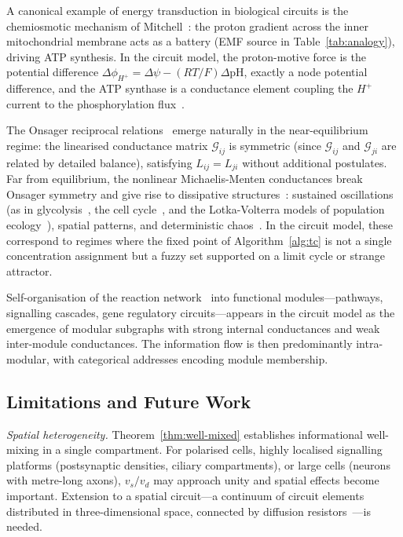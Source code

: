 \documentclass[twocolumn,10pt,a4paper]{article}
\newcommand{\Gcond}{\mathcal{G}}
\begin{document}
A canonical example of energy transduction in biological circuits is the
chemiosmotic mechanism of Mitchell~\cite{Mitchell1961}: the proton gradient
across the inner mitochondrial membrane acts as a battery (EMF source in
Table~\ref{tab:analogy}), driving ATP synthesis.  In the circuit model, the
proton-motive force is the potential difference $\Delta\phi_{H^+}=
\Delta\psi - (RT/F)\Delta\mathrm{pH}$, exactly a node potential difference,
and the ATP synthase is a conductance element coupling the $H^+$ current to
the phosphorylation flux~\cite{NichollsFerguson2002}.

The Onsager reciprocal relations~\cite{Onsager1931} emerge naturally in the
near-equilibrium regime: the linearised conductance matrix $\Gcond_{ij}$ is
symmetric (since $\Gcond_{ij}$ and $\Gcond_{ji}$ are related by detailed
balance), satisfying $L_{ij}=L_{ji}$ without additional postulates.  Far from
equilibrium, the nonlinear Michaelis-Menten conductances break Onsager
symmetry and give rise to dissipative structures~\cite{PrigogineNicolis1977,
Prigogine1967}: sustained oscillations (as in glycolysis~\cite{EpsteinPojman1998},
the cell cycle~\cite{Tyson2003}, and the Lotka-Volterra models of population
ecology~\cite{Lotka1925,Volterra1926,Kolmogorov1936}), spatial patterns, and
deterministic chaos~\cite{Strogatz1994}.  In the circuit model, these
correspond to regimes where the fixed point of Algorithm~\ref{alg:tc} is not
a single concentration assignment but a fuzzy set supported on a limit cycle
or strange attractor.

Self-organisation of the reaction network~\cite{Eigen1971} into
functional modules---pathways, signalling cascades, gene regulatory
circuits---appears in the circuit model as the emergence of modular subgraphs
with strong internal conductances and weak inter-module conductances.  The
information flow is then predominantly intra-modular, with categorical addresses
encoding module membership.

\subsection{Limitations and Future Work}
\label{sec:disc-limitations}

\emph{Spatial heterogeneity.}
Theorem~\ref{thm:well-mixed} establishes informational well-mixing in a single
compartment.  For polarised cells, highly localised signalling platforms
(postsynaptic densities, ciliary compartments), or large cells (neurons with
metre-long axons), $v_s/v_d$ may approach unity and spatial effects become
important.  Extension to a spatial circuit---a continuum of circuit elements
distributed in three-dimensional space, connected by diffusion
resistors~\cite{Murray2002}---is needed.
\end{document}
